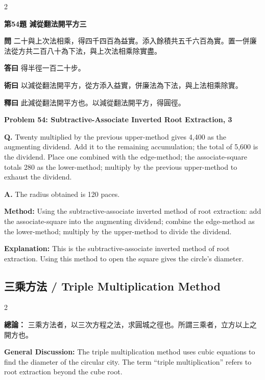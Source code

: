 \documentclass[11pt,a4paper]{article}
\newcommand{\wen}[1]{\noindent\textbf{問} #1\par\smallskip}
\newcommand{\da}[1]{\noindent\textbf{答曰} #1\par\smallskip}
\newcommand{\shu}[1]{\noindent\textbf{術曰} #1\par\smallskip}
\newcommand{\shi}[1]{\noindent\textbf{釋曰} #1\par\smallskip}
\newcommand{\wenE}[1]{\noindent\textbf{Q.} #1\par\smallskip}
\newcommand{\daE}[1]{\noindent\textbf{A.} #1\par\smallskip}
\newcommand{\shuE}[1]{\noindent\textbf{Method:} #1\par\smallskip}
\newcommand{\shiE}[1]{\noindent\textbf{Explanation:} #1\par\smallskip}
\begin{document}
\begin{paracol}{2}

\noindent\textbf{第54題 減從翻法開平方三}

\wen{二十與上次法相乘，得四千四百為益實。添入餘積共五千六百為實。置一併廉法從方共二百八十為下法，與上次法相乘除實盡。}
\da{得半徑一百二十步。}
\shu{以減從翻法開平方，從方添入益實，併廉法為下法，與上法相乘除實。}
\shi{此減從翻法開平方也。以減從翻法開平方，得圓徑。}

\switchcolumn

\noindent\textbf{Problem 54: Subtractive-Associate Inverted Root Extraction, 3}

\wenE{Twenty multiplied by the previous upper-method gives 4,400 as the augmenting dividend. Add it to the remaining accumulation; the total of 5,600 is the dividend. Place one combined with the edge-method; the associate-square totals 280 as the lower-method; multiply by the previous upper-method to exhaust the dividend.}
\daE{The radius obtained is 120 paces.}
\shuE{Using the subtractive-associate inverted method of root extraction: add the associate-square into the augmenting dividend; combine the edge-method as the lower-method; multiply by the upper-method to divide the dividend.}
\shiE{This is the subtractive-associate inverted method of root extraction. Using this method to open the square gives the circle's diameter.}

\end{paracol}

\clearpage

\subsection*{三乘方法 / Triple Multiplication Method}

\begin{paracol}{2}

\noindent\textbf{總論：} 三乘方法者，以三次方程之法，求圓城之徑也。所謂三乘者，立方以上之開方也。

\switchcolumn

\noindent\textbf{General Discussion:} The triple multiplication method uses cubic equations to find the diameter of the circular city. The term ``triple multiplication'' refers to root extraction beyond the cube root.

\end{paracol}
\end{document}
